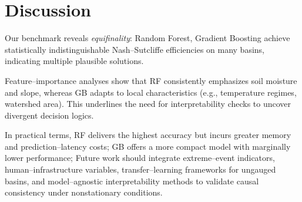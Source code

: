 \section{Discussion}
\label{sec:discussion}

Our benchmark reveals \emph{equifinality}: Random Forest, Gradient Boosting achieve statistically indistinguishable Nash--Sutcliffe efficiencies on many basins, indicating multiple plausible solutions.

Feature--importance analyses show that RF consistently emphasizes soil moisture and slope, whereas GB adapts to local characteristics (e.g., temperature regimes, watershed area). This underlines the need for interpretability checks to uncover divergent decision logics.

In practical terms, RF delivers the highest accuracy but incurs greater memory and prediction--latency costs; GB offers a more compact model with marginally lower performance; Future work should integrate extreme--event indicators, human--infrastructure variables, transfer--learning frameworks for ungauged basins, and model--agnostic interpretability methods to validate causal consistency under nonstationary conditions.







